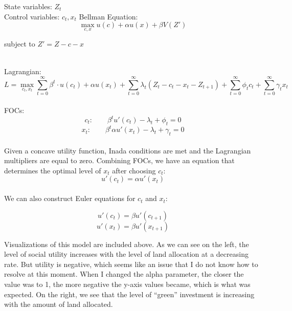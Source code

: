 \documentclass[12pt]{article}
\begin{document}
\noindent State variables: \(Z_t\) \\
\noindent Control variables: \(c_t, x_t\)
\newpage
\noindent Bellman Equation: 
\begin{equation}
	\max_{c, x} u(c) + \alpha u(x) + \beta V(Z')
\end{equation}
\begin{center}
	subject to \(Z' = Z - c - x\)
\end{center} \\
\noindent Lagrangian:
\begin{equation}
	L = \max_{c_t, x_t} \sum_{t=0}^{\infty} \beta^t \cdot u(c_t) + \alpha u(x_t) + \sum_{t=0}^{\infty} \lambda_t (Z_t - c_t - x_t - Z_{t+1}) + \sum_{t=0}^{\infty} \phi_t c_t +  \sum_{t=0}^{\infty} \gamma_t x_t
\end{equation} \\
\noindent FOCs: 
\begin{equation}
	c_t: \qquad \beta^t u'(c_t) - \lambda_t + \phi_t = 0
\end{equation}
\begin{equation}
	x_t: \qquad \beta^t \alpha u'(x_t) - \lambda_t + \gamma_t = 0 
\end{equation} \\
\noindent Given a concave utility function, Inada conditions are met and the Lagrangian multipliers are equal to zero. Combining FOCs, we have an equation that determines the optimal level of \(x_t\) after choosing \(c_t\): 
\begin{equation}
	u'(c_t) = \alpha u'(x_t)  
\end{equation} \\
\noindent We can also construct Euler equations for \(c_t\) and \(x_t\):
 
\begin{equation}
	u'(c_t) = \beta u'(c_{t+1})
\end{equation}
\begin{equation}
	u'(x_t) = \beta u'(x_{t+1})
\end{equation}

\newpage
\noindent Visualizations of this model are included above. As we can see on the left, the level of social utility increases with the level of land allocation at a decreasing rate. But utility is negative, which seems like an issue that I do not know how to resolve at this moment. When I changed the alpha parameter, the closer the value was to 1, the more negative the y-axis values became, which is what was expected. On the right, we see that the level of \enquote{green} investment is increasing with the amount of land allocated.
\end{document}
